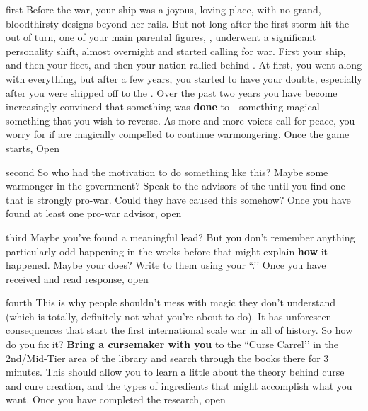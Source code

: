 \documentclass[notebook]{GL2020} %
\begin{document}
\startnotebook{\nWhoCursedWarlord{}}

\begin{page}{first}
Before the war, your ship was a joyous, loving place, with no grand, bloodthirsty designs beyond her rails. But not long after the first storm hit the \pShip{} out of turn, one of your main parental figures, \cLoud{\full}, underwent a significant personality shift, almost overnight and started calling for war. First your ship, and then your fleet, and then your nation rallied behind \cLoud{\them}. At first, you went along with everything, but after a few years, you started to have your doubts, especially after you were shipped off to the \pSchool{}. Over the past two years you have become increasingly convinced that something was \textbf{done} to \cLoud{} - something magical - something that you wish to reverse. As more and more voices call for peace, you worry for \cLoud{} if \cLoud{\they} are magically compelled to continue warmongering. Once the game starts, Open 
\end{page}

\begin{page}{second}
So who had the motivation to do something like this? Maybe some warmonger in the \pShip{} government? Speak to the advisors of the \pShip{} until you find one that is strongly pro-war. Could they have caused this somehow? Once you have found at least one pro-war \pShippie{} advisor, open 
\end{page}

\begin{page}{third}
Maybe you’ve found a meaningful lead? But you don’t remember anything particularly odd happening in the weeks before that might explain \textbf{how} it happened. Maybe your \cQuiet{\parent} \cQuiet{\full} does? Write to them using your ``\aLettersHome{}.’’ Once you have received and read \cQuiet{\their} response, open 
\end{page}

\begin{page}{fourth}
This is why people shouldn't mess with magic they don’t understand (which is totally, definitely not what you’re about to do). It has unforeseen consequences that start the first international scale war in all of history. So how do you fix it? \textbf{Bring a cursemaker with you} to the ``Curse Carrel’’ in the 2nd/Mid-Tier area of the library and search through the books there for 3 minutes. This should allow you to learn a little about the theory behind curse and cure creation, and the types of ingredients that might accomplish what you want. Once you have completed the research, open 
\end{page}
\end{document}
